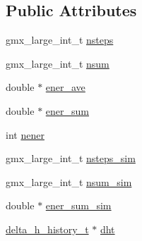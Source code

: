 \subsection*{\-Public \-Attributes}
\begin{DoxyCompactItemize}
\item 
gmx\-\_\-large\-\_\-int\-\_\-t \hyperlink{structenergyhistory__t_a80718602ffadca988268f68eda97282e}{nsteps}
\item 
gmx\-\_\-large\-\_\-int\-\_\-t \hyperlink{structenergyhistory__t_ad7e7d44d0a16f607575fbb40e4158606}{nsum}
\item 
double $\ast$ \hyperlink{structenergyhistory__t_aba6fcf4db2d0ee6a1825e41582d89807}{ener\-\_\-ave}
\item 
double $\ast$ \hyperlink{structenergyhistory__t_a6e0b61f3b01fa758428f3cac33d58be4}{ener\-\_\-sum}
\item 
int \hyperlink{structenergyhistory__t_a53713219d19942d602f7222fb905b706}{nener}
\item 
gmx\-\_\-large\-\_\-int\-\_\-t \hyperlink{structenergyhistory__t_a57825711d19a70a46f4c6010a7f13f2f}{nsteps\-\_\-sim}
\item 
gmx\-\_\-large\-\_\-int\-\_\-t \hyperlink{structenergyhistory__t_afac7f1a45c88b7b1440eea58a2a8adef}{nsum\-\_\-sim}
\item 
double $\ast$ \hyperlink{structenergyhistory__t_a36ac6002bc27d5e176c96fc44045525a}{ener\-\_\-sum\-\_\-sim}
\item 
\hyperlink{structdelta__h__history__t}{delta\-\_\-h\-\_\-history\-\_\-t} $\ast$ \hyperlink{structenergyhistory__t_a2f8ee0472c718380c016997c6061f235}{dht}
\end{DoxyCompactItemize}



